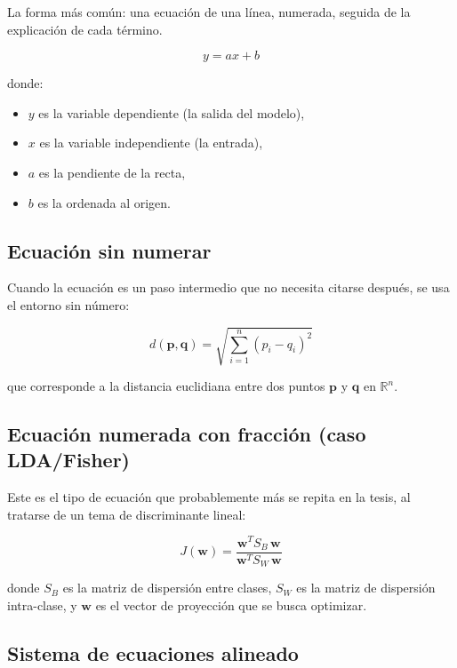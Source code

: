 La forma más común: una ecuación de una línea, numerada, seguida de la
explicación de cada término.

\begin{equation}
    y = ax + b
    \label{eq:lineal-simple}
\end{equation}

\noindent donde:
\begin{itemize}
    \item $y$ es la variable dependiente (la salida del modelo),
    \item $x$ es la variable independiente (la entrada),
    \item $a$ es la pendiente de la recta,
    \item $b$ es la ordenada al origen.
\end{itemize}

\subsection{Ecuación sin numerar}

Cuando la ecuación es un paso intermedio que no necesita citarse después,
se usa el entorno sin número:

\begin{equation*}
    d(\mathbf{p}, \mathbf{q}) = \sqrt{\sum_{i=1}^{n} (p_i - q_i)^2}
\end{equation*}

que corresponde a la distancia euclidiana entre dos puntos $\mathbf{p}$ y
$\mathbf{q}$ en $\mathbb{R}^n$.

\subsection{Ecuación numerada con fracción (caso LDA/Fisher)}

Este es el tipo de ecuación que probablemente más se repita en la tesis,
al tratarse de un tema de discriminante lineal:

\begin{equation}
    J(\mathbf{w}) = \frac{\mathbf{w}^T S_B \, \mathbf{w}}{\mathbf{w}^T S_W \, \mathbf{w}}
    \label{eq:fisher-ratio}
\end{equation}

\noindent donde $S_B$ es la matriz de dispersión entre clases, $S_W$ es la
matriz de dispersión intra-clase, y $\mathbf{w}$ es el vector de proyección
que se busca optimizar.

\subsection{Sistema de ecuaciones alineado}

